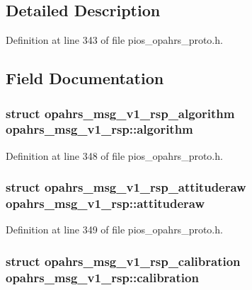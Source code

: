 \subsection{Detailed Description}


Definition at line 343 of file pios\-\_\-opahrs\-\_\-proto.\-h.



\subsection{Field Documentation}
\hypertarget{unionopahrs__msg__v1__rsp_a4af9b8f5f9eed55411351398ece97f47}{
\subsubsection[{algorithm}]{\setlength{\rightskip}{0pt plus 5cm}struct {\bf opahrs\-\_\-msg\-\_\-v1\-\_\-rsp\-\_\-algorithm} opahrs\-\_\-msg\-\_\-v1\-\_\-rsp\-::algorithm}}\label{unionopahrs__msg__v1__rsp_a4af9b8f5f9eed55411351398ece97f47}


Definition at line 348 of file pios\-\_\-opahrs\-\_\-proto.\-h.

\hypertarget{unionopahrs__msg__v1__rsp_ab96ad84f9d2d22faf24cb780f2da6ebe}{
\subsubsection[{attituderaw}]{\setlength{\rightskip}{0pt plus 5cm}struct {\bf opahrs\-\_\-msg\-\_\-v1\-\_\-rsp\-\_\-attituderaw} opahrs\-\_\-msg\-\_\-v1\-\_\-rsp\-::attituderaw}}\label{unionopahrs__msg__v1__rsp_ab96ad84f9d2d22faf24cb780f2da6ebe}


Definition at line 349 of file pios\-\_\-opahrs\-\_\-proto.\-h.

\hypertarget{unionopahrs__msg__v1__rsp_a9f9eca2cf183979d62cb16eb92782e42}{
\subsubsection[{calibration}]{\setlength{\rightskip}{0pt plus 5cm}struct {\bf opahrs\-\_\-msg\-\_\-v1\-\_\-rsp\-\_\-calibration} opahrs\-\_\-msg\-\_\-v1\-\_\-rsp\-::calibration}}\label{unionopahrs__msg__v1__rsp_a9f9eca2cf183979d62cb16eb92782e42}


